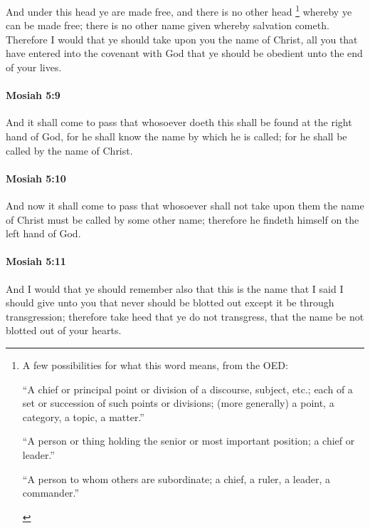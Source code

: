 			And under this head ye are made free,
			and there is no other head%
				\footnote{%
					A few possibilities for what this word means, from the OED:
					\begin{compactitem}
						\item[III.31] ``A chief or principal point or division of a discourse, subject, etc.; each of a set or succession of such points or divisions; (more generally) a point, a category, a topic, a matter.''
						\item[IV.34] ``A person or thing holding the senior or most important position; a chief or leader.''
						\item[IV.34a] ``A person to whom others are subordinate; a chief, a ruler, a leader, a commander.''
					\end{compactitem}
					}
			whereby ye can be made free;
			there is no other name given whereby salvation cometh.
			Therefore I would that ye should take upon you the name of Christ,
			all you that have entered into the covenant with God
			that ye should be obedient unto the end of your lives.

		\paragraph{Mosiah 5:9} %
			\label{MOSIAH-5-9}

			And it shall come to pass that
			whosoever doeth this shall be found at the right hand of God,
			for he shall know the name by which he is called;
			for he shall be called by the name of Christ.

		\paragraph{Mosiah 5:10} %
			\label{MOSIAH-5-10}

			And now it shall come to pass that
			whosoever shall not take upon them the name of Christ
			must be called by some other name;
			therefore he findeth himself on the left hand of God.

		\paragraph{Mosiah 5:11} %
			\label{MOSIAH-5-11}

			And I would that ye should remember also
			that this is the name that I said I should give unto you
			that never should be blotted out except it be through transgression;
			therefore take heed that ye do not transgress,
			that the name be not blotted out of your hearts.

